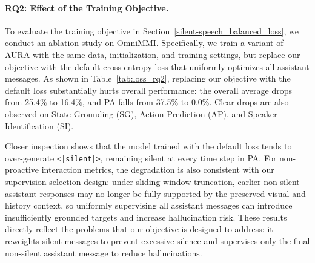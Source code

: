     
    
    
    
    

\paragraph{RQ2: Effect of the Training Objective.}
To evaluate the training objective in Section~\ref{silent-speech_balanced_loss}, we conduct an ablation study on OmniMMI. Specifically, we train a variant of AURA with the same data, initialization, and training settings, but replace our objective with the default cross-entropy loss that uniformly optimizes all assistant messages. As shown in Table~\ref{tab:loss_rq2}, replacing our objective with the default loss substantially hurts overall performance: the overall average drops from 25.4\% to 16.4\%, and PA falls from 37.5\% to 0.0\%. Clear drops are also observed on State Grounding (SG), Action Prediction (AP), and Speaker Identification (SI).

Closer inspection shows that the model trained with the default loss tends to over-generate \texttt{<|silent|>}, remaining silent at every time step in PA. For non-proactive interaction metrics, the degradation is also consistent with our supervision-selection design: under sliding-window truncation, earlier non-silent assistant responses may no longer be fully supported by the preserved visual and history context, so uniformly supervising all assistant messages can introduce insufficiently grounded targets and increase hallucination risk. 
These results directly reflect the problems that our objective is designed to address: it reweights silent messages to prevent excessive silence and supervises only the final non-silent assistant message to reduce hallucinations.

